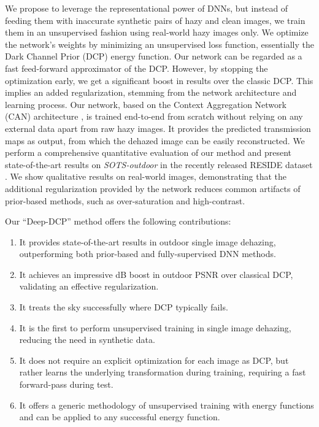 \documentclass[10pt,twocolumn,twoside]{IEEEtran}
\begin{document}
We propose to leverage the representational power of DNNs, but instead of feeding them with inaccurate synthetic pairs of hazy and clean images, we train them in an unsupervised fashion using real-world hazy images only. We optimize the network's weights by minimizing an unsupervised loss function, essentially the Dark Channel Prior (DCP) \cite{DCP} energy function. Our network can be regarded as a fast feed-forward approximator of the DCP. However, by stopping the optimization early, we get a significant boost in results over the classic DCP. This implies an added regularization, stemming from the network architecture and learning process. Our network, based on the Context Aggregation Network (CAN) architecture \cite{CAN}, is trained end-to-end from scratch without relying on any external data apart from raw hazy images. It provides the predicted transmission maps as output, from which the dehazed image can be easily reconstructed. We perform a comprehensive quantitative evaluation of our method and present state-of-the-art results on \textit{SOTS-outdoor} in the recently released RESIDE dataset \cite{reside}. We show qualitative results on real-world images, demonstrating that the additional regularization provided by the network reduces common artifacts of prior-based methods, such as over-saturation and high-contrast.

Our ``Deep-DCP'' method offers the following contributions: 
\begin{enumerate}
\item It provides state-of-the-art results in outdoor single image dehazing, outperforming both prior-based and fully-supervised DNN methods.
\item It achieves an impressive dB boost in outdoor PSNR over classical DCP, validating an effective regularization.
\item It treats the sky successfully where DCP typically fails.
\item It is the first to perform unsupervised training in single image dehazing, reducing the need in synthetic data.
\item It does not require an explicit optimization for each image as DCP, but rather learns the underlying transformation during training, requiring a fast forward-pass during test.
\item It offers a generic methodology of unsupervised training with energy functions and can be applied to any successful energy function.
\end{enumerate}
\end{document}
